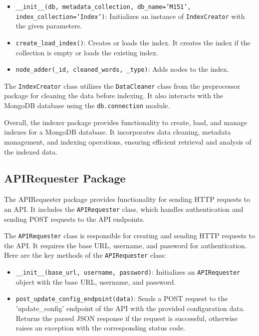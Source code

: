 \documentclass{article}
\begin{document}
\begin{itemize}
    \item \texttt{\_\_init\_\_(db, metadata\_collection, db\_name='M151', 
    index\_collection='Index')}: Initializes an instance of \texttt{IndexCreator} with the given 
    parameters.
    \item \texttt{create\_load\_index()}: Creates or loads the index. It creates the index if 
    the collection is empty or loads the existing index.
    \item \texttt{node\_adder(\_id, cleaned\_words, \_type)}: Adds nodes to the index.
\end{itemize}

The \texttt{IndexCreator} class utilizes the \texttt{DataCleaner} class from the preprocessor 
package for cleaning the data before indexing. It also interacts with the MongoDB database using 
the \texttt{db.connection} module.

Overall, the indexer package provides functionality to create, load, and manage indexes for a 
MongoDB database. It incorporates data cleaning, metadata management, and indexing operations, 
ensuring efficient retrieval and analysis of the indexed data.


\subsection{APIRequester Package}

The APIRequester package provides functionality for sending HTTP requests to an API. It includes 
the \texttt{APIRequester} class, which handles authentication and sending POST requests to the 
API endpoints.


The \texttt{APIRequester} class is responsible for creating and sending HTTP requests to the 
API. It requires the base URL, username, and password for authentication. Here are the key 
methods of the \texttt{APIRequester} class:

\begin{itemize}
    \item \texttt{\_\_init\_\_(base\_url, username, password)}: Initializes an 
    \texttt{APIRequester} object with the base URL, username, and password.
    \item \texttt{post\_update\_config\_endpoint(data)}: Sends a POST request to the 
    'update\_config' endpoint of the API with the provided configuration data. Returns the 
    parsed JSON response if the request is successful, otherwise raises an exception with the 
    corresponding status code.
\end{itemize}
\end{document}

